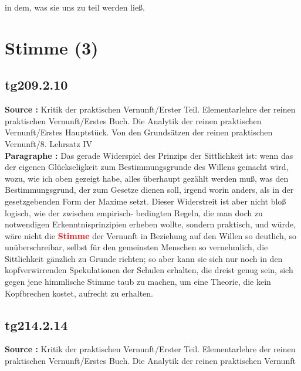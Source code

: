 \documentclass[a4paper,12pt,twoside]{book}
\newcommand{\match}[1]{\textcolor{red}{\textbf{#1}}}
\newcommand{\unnumberedsection}[1]{
	\section*{#1}
	\addcontentsline{toc}{section}{#1}
	\markright{#1}
}
\begin{document}
in dem, was sie uns zu teil werden ließ. 
	
	\unnumberedsection{Stimme (3)} 
	\subsection*{tg209.2.10} 
	\textbf{Source : }Kritik der praktischen Vernunft/Erster Teil. Elementarlehre der reinen praktischen Vernunft/Erstes Buch. Die Analytik der reinen praktischen Vernunft/Erstes Hauptstück. Von den Grundsätzen der reinen praktischen Vernunft/8. Lehrsatz IV\\  
	
	\noindent\textbf{Paragraphe : }Das gerade Widerspiel des Prinzips der Sittlichkeit ist: wenn das der eigenen Glückseligkeit zum Bestimmungsgrunde des Willens gemacht wird, wozu, wie ich oben gezeigt habe, alles überhaupt gezählt werden muß, was den Bestimmungsgrund, der zum Gesetze dienen soll, irgend worin anders, als in der gesetzgebenden Form der Maxime setzt. Dieser Widerstreit ist aber nicht bloß logisch, wie der zwischen empirisch- bedingten Regeln, die man doch zu notwendigen Erkenntnisprinzipien erheben wollte, sondern praktisch, und würde, wäre nicht die \match{Stimme} der Vernunft  in Beziehung auf den Willen so deutlich, so unüberschreibar, selbst für den gemeinsten Menschen so vernehmlich, die Sittlichkeit gänzlich zu Grunde richten; so aber kann sie sich nur noch in den kopfverwirrenden Spekulationen der Schulen erhalten, die dreist genug sein, sich gegen jene himmlische Stimme taub zu machen, um eine Theorie, die kein Kopfbrechen kostet, aufrecht zu erhalten. 
	
	\subsection*{tg214.2.14} 
	\textbf{Source : }Kritik der praktischen Vernunft/Erster Teil. Elementarlehre der reinen praktischen Vernunft/Erstes Buch. Die Analytik der reinen praktischen Vernunft\\  
	
\end{document}
